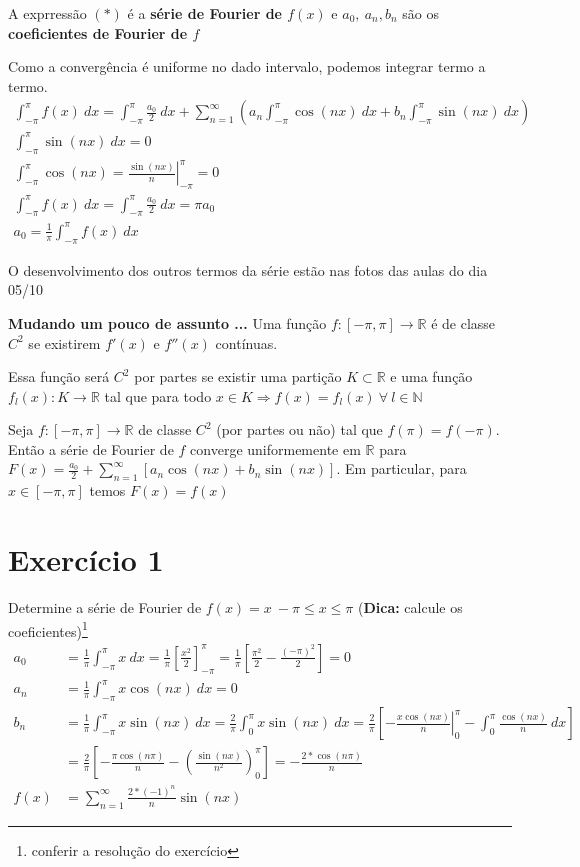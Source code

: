 \documentclass[12pt,openany, letterpaper]{book}
\newcommand{\soma}[2][n]{\sum_{{#1} = #2}^\infty}
\newcommand{\E}[1]{Exercício #1}
\newcommand{\IP}{\int_{-\pi}^{\pi}}
\begin{document}
{{A exprressão $(*)$ é a \textbf{série de Fourier de $f(x)$} e $a_0, \ a_n, b_n$ são os \textbf{coeficientes de Fourier de $f$} 

Como a convergência é uniforme no dado intervalo, podemos integrar termo a termo. \begin{align*}
    \IP f(x) \ dx = \IP \frac{a_0}{2} \ dx + \soma{1} \left( a_n \IP \cos (nx) \ dx + b_n \IP \sin (nx) \ dx \right) \\
    \IP \sin (nx) \ dx = 0 \\
    \IP \cos (nx) = \left. \frac{\sin (nx)}{n}\right|_{-\pi}^\pi = 0 \\
    \IP f(x) \ dx = \IP \frac{a_0}{2} \ dx = \pi a_0 \\
    a_0 = \frac{1}{\pi}\IP f(x) \ dx
\end{align*}

O desenvolvimento dos outros termos da série estão nas fotos das aulas do dia 05/10

\textbf{Mudando um pouco de assunto ...} Uma função $f:[-\pi,\pi] \rightarrow \mathds{R}$ é de classe $C^2$ se existirem $f'(x)$ e $f''(x)$ contínuas. 

Essa função será $C^2$ por partes se existir uma partição $K \subset \mathds{R}$ e uma função $f_l(x):K \rightarrow \mathds{R}$ tal que para todo $x \in K \Rightarrow f(x) = f_l(x) \ \forall \ l \in \mathds{N}$

Seja $f:[-\pi,\pi] \rightarrow \mathds{R}$ de classe $C^2$ (por partes ou não) tal que $f(\pi) = f(-\pi)$. Então a série de Fourier de $f$ converge uniformemente em $\mathds{R}$ para $\displaystyle{F(x) = \frac{a_0}{2} + \soma{1} [a_n \cos (nx) + b_n \sin (nx)]}$. Em particular, para $x \in [-\pi, \pi]$ temos $F(x) = f(x)$

\section*{\E 1} Determine a série de Fourier de $f(x) = x\ -\pi \leq x \leq \pi$ (\textbf{Dica:} calcule os coeficientes)\footnote{conferir a resolução do exercício} \begin{align*}
    a_0 &= \frac{1}{\pi} \IP x \ dx =     \frac{1}{\pi}\left[\frac{x^2}{2}\right]_{-\pi}^{\pi} =\frac{1}{\pi}         \left[\frac{\pi^2}{2}-\frac{(-\pi)^2}{2}\right] = 0 \\
    a_n &= \frac{1}{\pi}\IP x \cos (nx) \ dx = 0 \\
    b_n &= \frac{1}{\pi}\IP x \sin (nx) \ dx = \frac{2}{\pi} \int_0^\pi x \sin (nx)\ dx = \frac{2}{\pi} \left[ \left. -\frac{x \cos (nx)}{n}\right|_0^\pi - \int_0^\pi \frac{\cos (nx)}{n} \ dx \right] \\
    &= \frac{2}{\pi}\left[-\frac{\pi \cos (n\pi)}{n}-\left(\frac{\sin (nx)}{n^2}\right)_0^\pi \right] = -\frac{2 * \cos (n\pi)}{n} \\
    f(x) &= \soma{1} \frac{2*(-1)^n}{n}\sin (nx)
\end{align*}

}}
\end{document}
